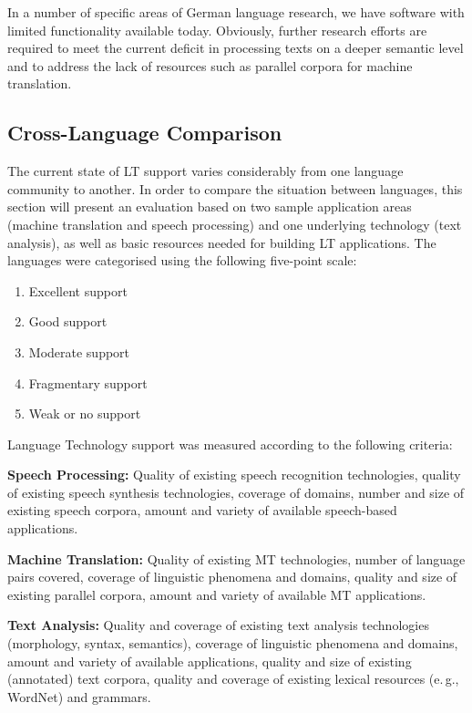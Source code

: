 \begin{multicols}{2}
In a number of specific areas of German language research, we have software with limited functionality available today. Obviously, further research efforts are required to meet the current deficit in processing texts on a deeper semantic level and to address the lack of resources such as parallel corpora for machine translation.

\subsection{Cross-Language Comparison}

The current state of LT support varies considerably from one language community to another. In order to compare the situation between languages, this section will present an evaluation based on two sample application areas (machine translation and speech processing) and one underlying technology (text analysis), as well as basic resources needed for building LT applications. The languages were categorised using the following five-point scale: 

\begin{enumerate}
\item Excellent support
\item Good support
\item Moderate support
\item Fragmentary support
\item Weak or no support
\end{enumerate}

Language Technology support was measured according to the following criteria:

\textbf{Speech Processing:} Quality of existing speech recognition technologies, quality of existing speech synthesis technologies, coverage of domains, number and size of existing speech corpora, amount and variety of available speech-based applications.

\textbf{Machine Translation:} Quality of existing MT technologies, number of language pairs covered, coverage of linguistic phenomena and domains, quality and size of existing parallel corpora, amount and variety of available MT applications.

\textbf{Text Analysis:} Quality and coverage of existing text analysis technologies (morphology, syntax, semantics), coverage of linguistic phenomena and domains, amount and variety of available applications, quality and size of existing (annotated) text corpora, quality and coverage of existing lexical resources (e.\,g., WordNet) and grammars.


\end{multicols}
